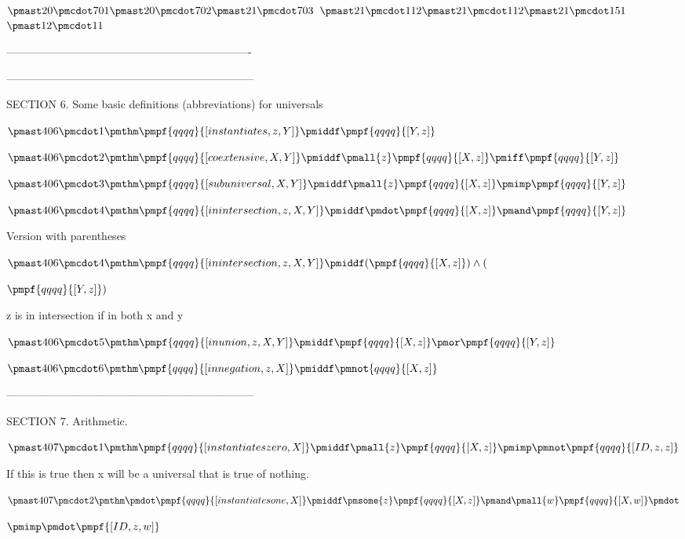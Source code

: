\documentclass[12pt]{article}
\begin{document}
$\pmast 20 \pmcdot 701\pmast 20 \pmcdot 702\pmast 21 \pmcdot 703$
$\pmast 21 \pmcdot 112\pmast 21 \pmcdot 112\pmast 21 \pmcdot 151$
$\pmast 12 \pmcdot 11$

-------------------------------------------------------------------


--------------------------------------------------------------------

SECTION 6. Some basic definitions (abbreviations) for universals

$\pmast 406 \pmcdot 1 \pmthm \pmpf{qqqq}{[instantiates, z, Y]} \pmiddf \pmpf{qqqq}{[Y, z]} $

$\pmast 406 \pmcdot 2 \pmthm \pmpf{qqqq}{[coextensive, X, Y]} \pmiddf \pmall{z} \pmpf{qqqq}{[X,z]} \pmiff \pmpf{qqqq}{[Y,z]} $

$\pmast 406 \pmcdot 3 \pmthm \pmpf{qqqq}{[subuniversal, X, Y]} \pmiddf \pmall{z} \pmpf{qqqq}{[X, z]}  \pmimp \pmpf{qqqq}{[Y, z]} $

$\pmast 406 \pmcdot 4 \pmthm \pmpf{qqqq}{[inintersection,z, X, Y]} \pmiddf \pmdot \pmpf{qqqq}{[X,z]} \pmand \pmpf{qqqq}{[Y,z]} $
 
 

Version with parentheses

$\pmast 406 \pmcdot 4 \pmthm \pmpf{qqqq}{[inintersection,z, X, Y]} \pmiddf  (  \pmpf{qqqq}{[X,z]} ) \land ( $

$\pmpf{qqqq}{[Y,z]} )$


z is in intersection if in both x and y

$\pmast 406 \pmcdot 5 \pmthm \pmpf{qqqq}{[inunion,z, X, Y]} \pmiddf \pmpf{qqqq}{[X,z]} \pmor \pmpf{qqqq}{[Y,z]} $

$\pmast 406 \pmcdot 6 \pmthm \pmpf{qqqq}{[innegation, z, X]} \pmiddf \pmnot{qqqq}{[X, z]} $

--------------------------------------------------------------------

SECTION 7. Arithmetic.

$\pmast 407 \pmcdot 1 \pmthm \pmpf{qqqq}{[instantiateszero, X]} \pmiddf \pmall{z} \pmpf{qqqq}{[X, z]} \pmimp \pmnot \pmpf{qqqq}{[ID, z, z]} $

If this is true then x will be a universal that is true of nothing. 

$\pmast 407 \pmcdot 2 \pmthm \pmdot \pmpf{qqqq}{[instantiatesone, X]} \pmiddf \pmsome{z} \pmpf{qqqq}{[X, z]} \pmand \pmall{w} \pmpf{qqqq}{[X, w]} \pmdot $

$\pmimp \pmdot \pmpf{[ID, z, w]} $
 
\end{document}
